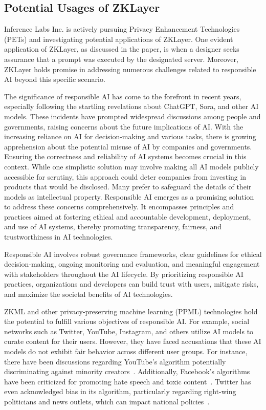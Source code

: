 \documentclass[conference]{IEEEtran}
\begin{document}
\subsection{Potential Usages of ZKLayer}

Inference Labs Inc. is actively pursuing Privacy Enhancement Technologies (PETs) and investigating potential applications of ZKLayer. One evident application of ZKLayer, as discussed in the paper, is when a designer seeks assurance that a prompt was executed by the designated server. Moreover, ZKLayer holds promise in addressing numerous challenges related to responsible AI beyond this specific scenario.

The significance of responsible AI has come to the forefront in recent years, especially following the startling revelations about ChatGPT, Sora, and other AI models. These incidents have prompted widespread discussions among people and governments, raising concerns about the future implications of AI. With the increasing reliance on AI for decision-making and various tasks, there is growing apprehension about the potential misuse of AI by companies and governments. Ensuring the correctness and reliability of AI systems becomes crucial in this context. While one simplistic solution may involve making all AI models publicly accessible for scrutiny, this approach could deter companies from investing in products that would be disclosed. Many prefer to safeguard the details of their models as intellectual property. Responsible AI emerges as a promising solution to address these concerns comprehensively. It encompasses principles and practices aimed at fostering ethical and accountable development, deployment, and use of AI systems, thereby promoting transparency, fairness, and trustworthiness in AI technologies.

Responsible AI involves robust governance frameworks, clear guidelines for ethical decision-making, ongoing monitoring and evaluation, and meaningful engagement with stakeholders throughout the AI lifecycle. By prioritizing responsible AI practices, organizations and developers can build trust with users, mitigate risks, and maximize the societal benefits of AI technologies.

ZKML and other privacy-preserving machine learning (PPML) technologies hold the potential to fulfill various objectives of responsible AI. For example, social networks such as Twitter, YouTube, Instagram, and others utilize AI models to curate content for their users. However, they have faced accusations that these AI models do not exhibit fair behavior across different user groups. For instance, there have been discussions regarding YouTube's algorithm potentially discriminating against minority creators~\cite{YoutubeAlgorithmHackernoon}. Additionally, Facebook's algorithms have been criticized for promoting hate speech and toxic content~\cite{FacebookAlgorithmPeoplesDispatch}. Twitter has even acknowledged bias in its algorithm, particularly regarding right-wing politicians and news outlets, which can impact national policies~\cite{TwitterBiasTheGuardian}.
\end{document}
